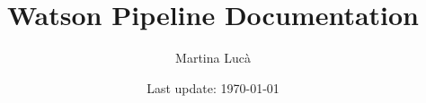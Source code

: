 \documentclass{article}
\title{Watson Pipeline Documentation}
\author{Martina Lucà \\ \href{mailto:martina.luca@univr.it}{\faEnvelope} \href{https://github.com/martiluca/Watson-documentation}{\faGithub}}
\date{Last update: \today}
\begin{document}
\maketitle

\small
\tableofcontents
\normalsize





\end{document}
